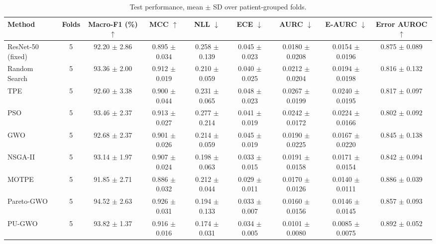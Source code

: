 \begin{table}[t]
\centering
\caption{Test performance, mean $\pm$ SD over patient-grouped folds.}
\label{tab:table3_main_results}
\small
\begin{tabular}{lcccccccc}
\toprule
Method & Folds & Macro-F1 (\%) $\uparrow$ & MCC $\uparrow$ & NLL $\downarrow$ & ECE $\downarrow$ & AURC $\downarrow$ & E-AURC $\downarrow$ & Error AUROC $\uparrow$ \\
\midrule
ResNet-50 (fixed) & 5 & 92.20 $\pm$ 2.86 & 0.895 $\pm$ 0.034 & 0.258 $\pm$ 0.139 & 0.045 $\pm$ 0.023 & 0.0180 $\pm$ 0.0208 & 0.0154 $\pm$ 0.0196 & 0.875 $\pm$ 0.089 \\
Random Search & 5 & 93.36 $\pm$ 2.00 & 0.912 $\pm$ 0.019 & 0.210 $\pm$ 0.059 & 0.040 $\pm$ 0.025 & 0.0212 $\pm$ 0.0204 & 0.0194 $\pm$ 0.0198 & 0.816 $\pm$ 0.132 \\
TPE & 5 & 92.60 $\pm$ 3.38 & 0.900 $\pm$ 0.044 & 0.231 $\pm$ 0.065 & 0.048 $\pm$ 0.023 & 0.0267 $\pm$ 0.0199 & 0.0240 $\pm$ 0.0195 & 0.817 $\pm$ 0.097 \\
PSO & 5 & 93.46 $\pm$ 2.37 & 0.913 $\pm$ 0.027 & 0.277 $\pm$ 0.214 & 0.041 $\pm$ 0.019 & 0.0242 $\pm$ 0.0172 & 0.0224 $\pm$ 0.0166 & 0.802 $\pm$ 0.092 \\
GWO & 5 & 92.68 $\pm$ 2.37 & 0.901 $\pm$ 0.026 & 0.214 $\pm$ 0.059 & 0.045 $\pm$ 0.019 & 0.0190 $\pm$ 0.0225 & 0.0167 $\pm$ 0.0220 & 0.845 $\pm$ 0.138 \\
NSGA-II & 5 & 93.14 $\pm$ 1.97 & 0.907 $\pm$ 0.024 & 0.198 $\pm$ 0.063 & 0.033 $\pm$ 0.015 & 0.0191 $\pm$ 0.0158 & 0.0171 $\pm$ 0.0154 & 0.842 $\pm$ 0.094 \\
MOTPE & 5 & 91.85 $\pm$ 2.71 & 0.886 $\pm$ 0.032 & 0.212 $\pm$ 0.044 & 0.029 $\pm$ 0.011 & 0.0170 $\pm$ 0.0126 & 0.0140 $\pm$ 0.0111 & 0.886 $\pm$ 0.039 \\
Pareto-GWO & 5 & 94.52 $\pm$ 2.63 & 0.926 $\pm$ 0.031 & 0.194 $\pm$ 0.133 & 0.033 $\pm$ 0.007 & 0.0160 $\pm$ 0.0156 & 0.0146 $\pm$ 0.0145 & 0.857 $\pm$ 0.093 \\
PU-GWO & 5 & 93.82 $\pm$ 1.37 & 0.916 $\pm$ 0.016 & 0.174 $\pm$ 0.031 & 0.034 $\pm$ 0.005 & 0.0101 $\pm$ 0.0080 & 0.0085 $\pm$ 0.0075 & 0.892 $\pm$ 0.052 \\
\bottomrule
\end{tabular}
\end{table}
